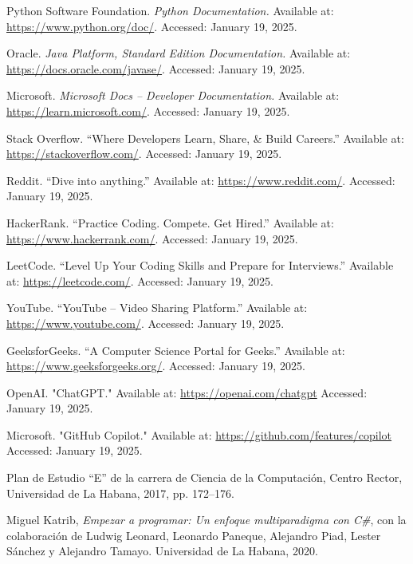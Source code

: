 \documentclass{article}
\begin{document}
\begin{thebibliography}{99}
Python Software Foundation. \textit{Python Documentation.} Available at: \url{https://www.python.org/doc/}. Accessed: January 19, 2025.

Oracle. \textit{Java Platform, Standard Edition Documentation.} Available at: \url{https://docs.oracle.com/javase/}. Accessed: January 19, 2025.

Microsoft. \textit{Microsoft Docs – Developer Documentation.} Available at: \url{https://learn.microsoft.com/}. Accessed: January 19, 2025.

Stack Overflow. ``Where Developers Learn, Share, \& Build Careers.'' Available at: \url{https://stackoverflow.com/}. Accessed: January 19, 2025.

Reddit. ``Dive into anything.'' Available at: \url{https://www.reddit.com/}. Accessed: January 19, 2025.

HackerRank. ``Practice Coding. Compete. Get Hired.'' Available at: \url{https://www.hackerrank.com/}. Accessed: January 19, 2025.

LeetCode. ``Level Up Your Coding Skills and Prepare for Interviews.'' Available at: \url{https://leetcode.com/}. Accessed: January 19, 2025.

YouTube. ``YouTube – Video Sharing Platform.'' Available at: \url{https://www.youtube.com/}. Accessed: January 19, 2025.

GeeksforGeeks. ``A Computer Science Portal for Geeks.'' Available at: \url{https://www.geeksforgeeks.org/}. Accessed: January 19, 2025.

OpenAI. "ChatGPT." Available at: \url{https://openai.com/chatgpt} Accessed: January 19, 2025.

Microsoft. "GitHub Copilot." Available at: \url{https://github.com/features/copilot} Accessed: January 19, 2025.

Plan de Estudio ``E'' de la carrera de Ciencia de la Computación, Centro Rector, Universidad de La Habana, 2017, pp. 172--176.

Miguel Katrib, \textit{Empezar a programar: Un enfoque multiparadigma con C\#}, con la colaboración de Ludwig Leonard, Leonardo Paneque, Alejandro Piad, Lester Sánchez y Alejandro Tamayo. Universidad de La Habana, 2020.

\end{thebibliography}
\end{document}
